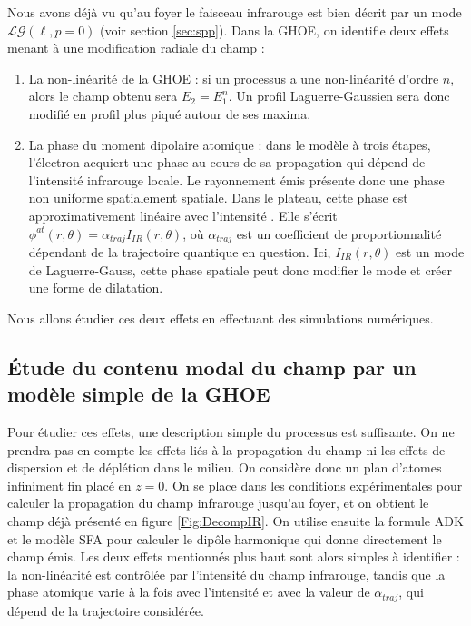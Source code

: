 Nous avons déjà vu qu'au foyer le faisceau infrarouge est bien décrit par un mode $\mathcal{LG}(\ell,p=0)$ (voir section \ref{sec:spp}). Dans la GHOE, on identifie deux effets menant à une modification radiale du champ : 
\begin{enumerate}
\item La non-linéarité de la GHOE : si un processus a une non-linéarité d'ordre $n$, alors le champ obtenu sera $E_2=E_1^n$. Un profil Laguerre-Gaussien sera donc modifié en profil plus piqué autour de ses maxima.

\item La phase du moment dipolaire atomique : dans le modèle à trois étapes, l'électron acquiert une phase au cours de sa propagation qui dépend de l'intensité infrarouge locale. Le rayonnement émis présente donc une phase non uniforme spatialement spatiale. Dans le plateau, cette phase est approximativement linéaire avec l'intensité . Elle s'écrit $\phi^{at}(r,\theta) = \alpha_{traj} I_{IR}(r,\theta)$, où $\alpha_{traj}$ est un coefficient de proportionnalité dépendant de la trajectoire quantique en question. Ici, $I_{IR}(r,\theta)$ est un mode de Laguerre-Gauss, cette phase spatiale peut donc modifier le mode et créer une forme de dilatation.
\end{enumerate}
Nous allons étudier ces deux effets en effectuant des simulations numériques.

\subsection{\'{E}tude du contenu modal du champ par un modèle simple de la GHOE}
Pour étudier ces effets, une description simple du processus est suffisante. On ne prendra pas en compte les effets liés à la propagation du champ ni les effets de dispersion et de déplétion dans le milieu. On considère donc un plan d'atomes infiniment fin placé en $z=0$. On se place dans les conditions expérimentales pour calculer la propagation du champ infrarouge jusqu'au foyer, et on obtient le champ déjà présenté en figure \ref{Fig:DecompIR}. On utilise ensuite la formule ADK  et le modèle SFA  pour calculer le dipôle harmonique qui donne directement le champ émis. Les deux effets mentionnés plus haut sont alors simples à identifier : la non-linéarité est contrôlée par l'intensité du champ infrarouge, tandis que la phase atomique varie à la fois avec l'intensité et avec la valeur de $\alpha_{traj}$, qui dépend de la trajectoire considérée.

